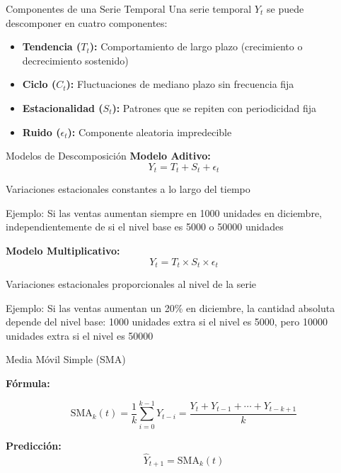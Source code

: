 \documentclass{beamer}
\begin{document}
\begin{frame}{Componentes de una Serie Temporal}
    Una serie temporal $Y_t$ se puede descomponer en cuatro componentes:
    
    \vspace{0.5cm}
    
    \begin{itemize}
        \item \textbf{Tendencia ($T_t$):} Comportamiento de largo plazo (crecimiento o decrecimiento sostenido)
        \item \textbf{Ciclo ($C_t$):} Fluctuaciones de mediano plazo sin frecuencia fija
        \item \textbf{Estacionalidad ($S_t$):} Patrones que se repiten con periodicidad fija
        \item \textbf{Ruido ($\epsilon_t$):} Componente aleatoria impredecible
    \end{itemize}
\end{frame}

\begin{frame}{Modelos de Descomposición}
    \textbf{Modelo Aditivo:}
    \[
    Y_t = T_t + S_t + \epsilon_t
    \]
    
    Variaciones estacionales constantes a lo largo del tiempo
    
    \vspace{0.3cm}
    
    \small{Ejemplo: Si las ventas aumentan siempre en 1000 unidades en diciembre, independientemente de si el nivel base es 5000 o 50000 unidades}
    
    \vspace{0.5cm}
    
    \textbf{Modelo Multiplicativo:}
    \[
    Y_t = T_t \times S_t \times \epsilon_t
    \]
    
    Variaciones estacionales proporcionales al nivel de la serie
    
    \vspace{0.3cm}
    
    \small{Ejemplo: Si las ventas aumentan un 20\% en diciembre, la cantidad absoluta depende del nivel base: 1000 unidades extra si el nivel es 5000, pero 10000 unidades extra si el nivel es 50000}
\end{frame}

\begin{frame}{Media Móvil Simple (SMA)}
    \begin{center}
        \Large{\textbf{Fórmula:}}
        
        \vspace{0.5cm}
        
        \[
        \text{SMA}_k(t) = \frac{1}{k} \sum_{i=0}^{k-1} Y_{t-i} = \frac{Y_t + Y_{t-1} + \cdots + Y_{t-k+1}}{k}
        \]
        
        \vspace{0.8cm}
        
        \textbf{Predicción:}
        \[
        \hat{Y}_{t+1} = \text{SMA}_k(t)
        \]
    \end{center}
\end{frame}
\end{document}
